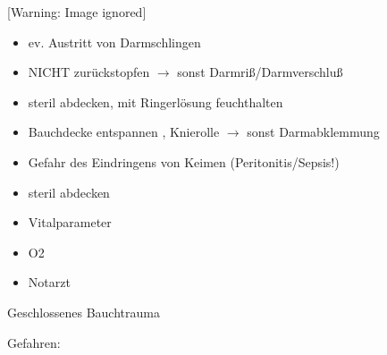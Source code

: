 \documentclass{article}
\begin{document}
\begin{center}
 [Warning: Image ignored] %

\end{center}
\begin{itemize}
\item ev. Austritt von Darmschlingen

\end{itemize}
\begin{itemize}
\item NICHT  zur\"uckstopfen ${\rightarrow}$ sonst 
Darmri{\ss}/Darmverschlu{\ss}

\item steril abdecken, mit Ringerl\"osung feuchthalten

\item Bauchdecke entspannen , Knierolle ${\rightarrow}$ sonst 
Darmabklemmung

\end{itemize}
\begin{itemize}
\item Gefahr des Eindringens von Keimen  (Peritonitis/Sepsis!)

\end{itemize}
\begin{itemize}
\item steril  abdecken

\item Vitalparameter

\item O2

\item Notarzt

\end{itemize}
Geschlossenes Bauchtrauma

Gefahren:
\end{document}
